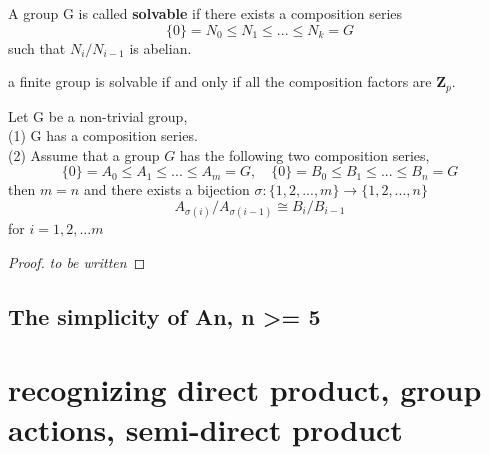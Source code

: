 \documentclass[11pt,fleqn]{book} %
\begin{document}
\begin{CJK}{UTF8}{gkai}
\begin{definition}
	[solvable] A group G is called {\bf solvable} if there exists a composition series 
	\[\{0\} = N_0 \leq N_1 \leq ... \leq N_k = G\] 
	such that $N_i / N_{i-1}$ is abelian.
\end{definition}

\begin{corollary}
	a finite group is solvable if and only if all the composition factors are $\mathbf{Z}_p$.
\end{corollary}

\begin{theorem}
	 Let G be a non-trivial group, \\ 
	(1) G has a composition series. \\(2) Assume that a group $G$ has the following two composition series, 
	\[\{0\} = A_0 \leq A_1 \leq ... \leq A_m = G, \quad \{0\} = B_0 \leq B_1 \leq ... \leq B_n = G\]
	then $m = n$ and there exists a bijection $\sigma:\{1,2,...,m\}\to \{1,2,...,n\}$
	\[A_{\sigma(i)} / A_{\sigma(i-1)} \cong B_i / B_{i-1}\]
	for $i = 1, 2, ... m$
\end{theorem}

\begin{proof}
	{\it to be written}
\end{proof}

\subsection{The simplicity of An, n >= 5}

\begin{proposition}
	
\end{proposition}

\section{recognizing direct product, group actions, semi-direct product}

\end{CJK}
\end{document}
